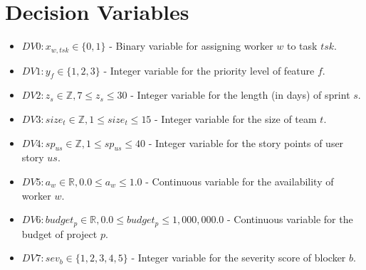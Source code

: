 \documentclass[11pt]{article}
\begin{document}
\section{Decision Variables}
\begin{itemize}
    \item $DV0: x_{w, tsk} \in \{0, 1\}$ - Binary variable for assigning worker $w$ to task $tsk$.
    \item $DV1: y_f \in \{1, 2, 3\}$ - Integer variable for the priority level of feature $f$.
    \item $DV2: z_s \in \mathbb{Z}, 7 \leq z_s \leq 30$ - Integer variable for the length (in days) of sprint $s$.
    \item $DV3: size_t \in \mathbb{Z}, 1 \leq size_t \leq 15$ - Integer variable for the size of team $t$.
    \item $DV4: sp_{us} \in \mathbb{Z}, 1 \leq sp_{us} \leq 40$ - Integer variable for the story points of user story $us$.
    \item $DV5: a_w \in \mathbb{R}, 0.0 \leq a_w \leq 1.0$ - Continuous variable for the availability of worker $w$.
    \item $DV6: budget_p \in \mathbb{R}, 0.0 \leq budget_p \leq 1,000,000.0$ - Continuous variable for the budget of project $p$.
    \item $DV7: sev_b \in \{1, 2, 3, 4, 5\}$ - Integer variable for the severity score of blocker $b$.
\end{itemize}
\end{document}
